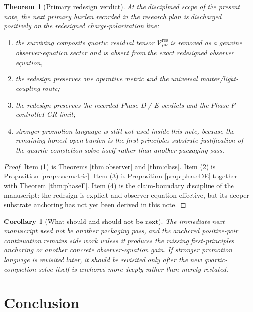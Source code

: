 \documentclass[11pt]{article}
\newcommand{\ResidualCore}{\mathcal V_{\mu\nu}^{\mathrm{res}}}
\newtheorem{corollary}{Corollary}
\newtheorem{theorem}{Theorem}
\begin{document}
\begin{theorem}[Primary redesign verdict]
\label{thm:verdict}
At the disciplined scope of the present note, the next primary burden recorded in the research plan is discharged positively on the redesigned charge-polarization line:
\begin{enumerate}
    \item the surviving composite quartic residual tensor \(\ResidualCore\) is removed as a genuine observer-equation sector and is absent from the exact redesigned observer equation;
    \item the redesign preserves one operative metric and the universal matter/light-coupling route;
    \item the redesign preserves the recorded Phase D / E verdicts and the Phase F controlled GR limit;
    \item stronger promotion language is still not used inside this note, because the remaining honest open burden is the first-principles substrate justification of the quartic-completion solve itself rather than another packaging pass.
\end{enumerate}
\end{theorem}

\begin{proof}
Item (1) is Theorems \ref{thm:observer} and \ref{thm:class}. Item (2) is Proposition \ref{prop:onemetric}. Item (3) is Proposition \ref{prop:phaseDE} together with Theorem \ref{thm:phaseF}. Item (4) is the claim-boundary discipline of the manuscript: the redesign is explicit and observer-equation effective, but its deeper substrate anchoring has not yet been derived in this note.
\end{proof}

\begin{corollary}[What should and should not be next]
The immediate next manuscript need not be another packaging pass, and the anchored positive-pair continuation remains side work unless it produces the missing first-principles anchoring or another concrete observer-equation gain. If stronger promotion language is revisited later, it should be revisited only after the new quartic-completion solve itself is anchored more deeply rather than merely restated.
\end{corollary}

\section{Conclusion}
\end{document}

